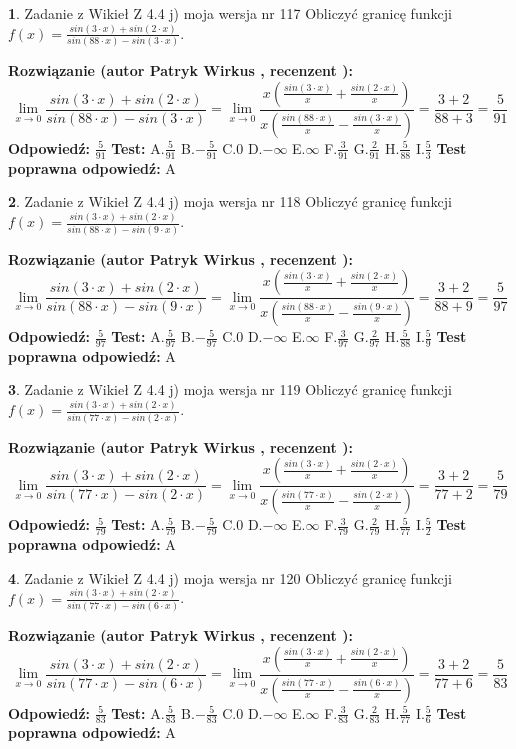 \documentclass[12pt, a4paper]{article}
\theoremstyle{definition} %
\newtheorem{zad}{}
\newcommand{\zadStart}[1]{\begin{zad}#1\newline}
\newcommand{\zadStop}{\end{zad}}
\newcommand{\rozwStart}[2]{\noindent \textbf{Rozwiązanie (autor #1 , recenzent #2): }\newline}
\newcommand{\rozwStop}{\newline}
\newcommand{\odpStart}{\noindent \textbf{Odpowiedź:}\newline}
\newcommand{\odpStop}{\newline}
\newcommand{\testStart}{\noindent \textbf{Test:}\newline}
\newcommand{\testStop}{\newline}
\newcommand{\kluczStart}{\noindent \textbf{Test poprawna odpowiedź:}\newline}
\newcommand{\kluczStop}{\newline}
\begin{document}
\zadStart{Zadanie z Wikieł Z 4.4 j) moja wersja nr 117}
Obliczyć granicę funkcji $f(x)=\frac{sin(3\cdot x) +sin(2\cdot x)}{sin(88\cdot x) -sin(3\cdot x)}$.
\zadStop
\rozwStart{Patryk Wirkus}{}
$$\lim\limits_{x\to 0}\frac{sin(3\cdot x) +sin(2\cdot x)}{sin(88\cdot x) -sin(3\cdot x)}=\lim\limits_{x\to 0}\frac{x(\frac{sin(3\cdot x)}{x}+\frac{sin(2\cdot x)}{x})}{x(\frac{sin(88\cdot x)}{x}-\frac{sin(3\cdot x)}{x})}=\frac{3+2}{88+3} = \frac{5}{91}$$
\rozwStop
\odpStart
$\frac{5}{91}$
\odpStop
\testStart
A.$\frac{5}{91}$
B.$-\frac{5}{91}$
C.$0$
D.$-\infty$
E.$\infty$
F.$\frac{3}{91}$
G.$\frac{2}{91}$
H.$\frac{5}{88}$
I.$\frac{5}{3}$
\testStop
\kluczStart
A
\kluczStop



\zadStart{Zadanie z Wikieł Z 4.4 j) moja wersja nr 118}
Obliczyć granicę funkcji $f(x)=\frac{sin(3\cdot x) +sin(2\cdot x)}{sin(88\cdot x) -sin(9\cdot x)}$.
\zadStop
\rozwStart{Patryk Wirkus}{}
$$\lim\limits_{x\to 0}\frac{sin(3\cdot x) +sin(2\cdot x)}{sin(88\cdot x) -sin(9\cdot x)}=\lim\limits_{x\to 0}\frac{x(\frac{sin(3\cdot x)}{x}+\frac{sin(2\cdot x)}{x})}{x(\frac{sin(88\cdot x)}{x}-\frac{sin(9\cdot x)}{x})}=\frac{3+2}{88+9} = \frac{5}{97}$$
\rozwStop
\odpStart
$\frac{5}{97}$
\odpStop
\testStart
A.$\frac{5}{97}$
B.$-\frac{5}{97}$
C.$0$
D.$-\infty$
E.$\infty$
F.$\frac{3}{97}$
G.$\frac{2}{97}$
H.$\frac{5}{88}$
I.$\frac{5}{9}$
\testStop
\kluczStart
A
\kluczStop



\zadStart{Zadanie z Wikieł Z 4.4 j) moja wersja nr 119}
Obliczyć granicę funkcji $f(x)=\frac{sin(3\cdot x) +sin(2\cdot x)}{sin(77\cdot x) -sin(2\cdot x)}$.
\zadStop
\rozwStart{Patryk Wirkus}{}
$$\lim\limits_{x\to 0}\frac{sin(3\cdot x) +sin(2\cdot x)}{sin(77\cdot x) -sin(2\cdot x)}=\lim\limits_{x\to 0}\frac{x(\frac{sin(3\cdot x)}{x}+\frac{sin(2\cdot x)}{x})}{x(\frac{sin(77\cdot x)}{x}-\frac{sin(2\cdot x)}{x})}=\frac{3+2}{77+2} = \frac{5}{79}$$
\rozwStop
\odpStart
$\frac{5}{79}$
\odpStop
\testStart
A.$\frac{5}{79}$
B.$-\frac{5}{79}$
C.$0$
D.$-\infty$
E.$\infty$
F.$\frac{3}{79}$
G.$\frac{2}{79}$
H.$\frac{5}{77}$
I.$\frac{5}{2}$
\testStop
\kluczStart
A
\kluczStop



\zadStart{Zadanie z Wikieł Z 4.4 j) moja wersja nr 120}
Obliczyć granicę funkcji $f(x)=\frac{sin(3\cdot x) +sin(2\cdot x)}{sin(77\cdot x) -sin(6\cdot x)}$.
\zadStop
\rozwStart{Patryk Wirkus}{}
$$\lim\limits_{x\to 0}\frac{sin(3\cdot x) +sin(2\cdot x)}{sin(77\cdot x) -sin(6\cdot x)}=\lim\limits_{x\to 0}\frac{x(\frac{sin(3\cdot x)}{x}+\frac{sin(2\cdot x)}{x})}{x(\frac{sin(77\cdot x)}{x}-\frac{sin(6\cdot x)}{x})}=\frac{3+2}{77+6} = \frac{5}{83}$$
\rozwStop
\odpStart
$\frac{5}{83}$
\odpStop
\testStart
A.$\frac{5}{83}$
B.$-\frac{5}{83}$
C.$0$
D.$-\infty$
E.$\infty$
F.$\frac{3}{83}$
G.$\frac{2}{83}$
H.$\frac{5}{77}$
I.$\frac{5}{6}$
\testStop
\kluczStart
A
\kluczStop
\end{document}
